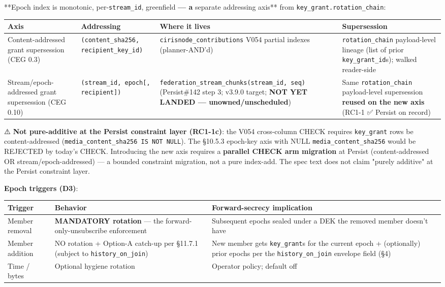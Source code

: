 \documentclass[11pt]{article}
\begin{document}
**Epoch index is monotonic, per-\texttt{stream\_id}, greenfield\textbf{ — a }separate addressing axis** from \texttt{key\_grant.rotation\_chain}:


{\scriptsize
\begin{longtable}{|p{4.0cm}|p{4.0cm}|p{4.0cm}|p{4.0cm}|}\hline
\textbf{Axis} & \textbf{Addressing} & \textbf{Where it lives} & \textbf{Supersession} \\ \hline\endhead
Content-addressed grant supersession (CEG 0.3) & \texttt{(content\_sha256, recipient\_key\_id)} & \texttt{cirisnode\_contributions} V054 partial indexes (planner-AND'd) & \texttt{rotation\_chain} payload-level lineage (list of prior \texttt{key\_grant\_id}s); walked reader-side \\ \hline
Stream/epoch-addressed grant supersession (CEG 0.10) & \texttt{(stream\_id, epoch[, recipient])} & \texttt{federation\_stream\_chunks(stream\_id, seq)} (Persist\#142 step 3; v3.9.0 target; \textbf{NOT YET LANDED — unowned/unscheduled}) & Same \texttt{rotation\_chain} payload-level supersession \textbf{reused on the new axis} (RC1-1 ✅ Persist on record) \\ \hline
\end{longtable}}


⚠️ \textbf{Not pure-additive at the Persist constraint layer (RC1-1c)}: the V054 cross-column CHECK requires \texttt{key\_grant} rows be content-addressed (\texttt{media\_content\_sha256 IS NOT NULL}). The §10.5.3 epoch-key axis with NULL \texttt{media\_content\_sha256} would be REJECTED by today's CHECK. Introducing the new axis requires a \textbf{parallel CHECK arm migration} at Persist (content-addressed OR stream/epoch-addressed) — a bounded constraint migration, not a pure index-add. The spec text does not claim "purely additive" at the Persist constraint layer.


\textbf{Epoch triggers (D3)}:


{\footnotesize
\begin{longtable}{|p{5.33cm}|p{5.33cm}|p{5.33cm}|}\hline
\textbf{Trigger} & \textbf{Behavior} & \textbf{Forward-secrecy implication} \\ \hline\endhead
Member removal & \textbf{MANDATORY rotation} — the forward-only-unsubscribe enforcement & Subsequent epochs sealed under a DEK the removed member doesn't have \\ \hline
Member addition & NO rotation + Option-A catch-up per §11.7.1 (subject to \texttt{history\_on\_join}) & New member gets \texttt{key\_grant}s for the current epoch + (optionally) prior epochs per the \texttt{history\_on\_join} envelope field (§4) \\ \hline
Time / bytes & Optional hygiene rotation & Operator policy; default off \\ \hline
\end{longtable}}
\end{document}
